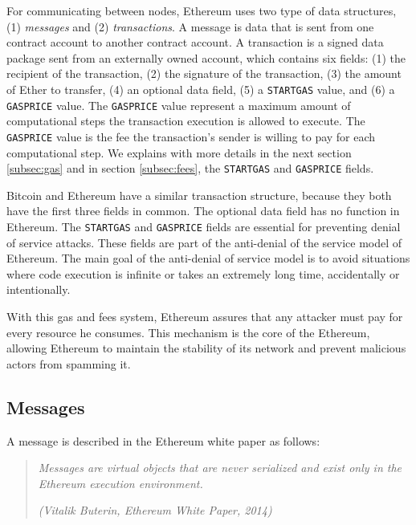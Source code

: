 For communicating between nodes, Ethereum uses two type of data structures, (1) \textit{messages} and (2) \textit{transactions}. A message is data that is sent from one contract
account to another contract account. A transaction is a signed data package sent from an externally owned account, which contains six fields: (1) the recipient of the transaction, (2) the signature of the transaction, (3) the amount of Ether to transfer,
(4) an optional data field, (5) a \texttt{STARTGAS} value, and (6) a \texttt{GASPRICE} value. The \texttt{GASPRICE} value represent a maximum amount of computational steps the transaction execution is allowed to execute.
The \texttt{GASPRICE} value is the fee the transaction's sender 
is willing to pay for each computational step. We explains with more details in the next section \ref{subsec:gas} and in section \ref{subsec:fees}, 
the \texttt{STARTGAS} and \texttt{GASPRICE} fields. 

Bitcoin and Ethereum have a similar transaction structure, because they both have the first three fields in common. The optional data field has no function in Ethereum. The \texttt{STARTGAS} and \texttt{GASPRICE} fields are
essential for preventing denial of service attacks. These fields are part of the anti-denial of the service model of Ethereum. The main goal of
the anti-denial of service model is to avoid situations where code execution is infinite or takes an extremely long time, accidentally
or intentionally.

With this gas and fees system, Ethereum assures that any attacker must pay for every resource he consumes. This mechanism is the core of the Ethereum,
allowing Ethereum to maintain the stability of its network and prevent malicious actors from spamming it.


\subsection{Messages}

A message is described in the Ethereum white paper \cite{ethereum_white_paper} as follows:


\begin{quote}
   \textit{Messages are virtual objects that are never serialized and exist only in the Ethereum execution environment.}

   \textit{(Vitalik Buterin, Ethereum White Paper, 2014)}
\end{quote}


